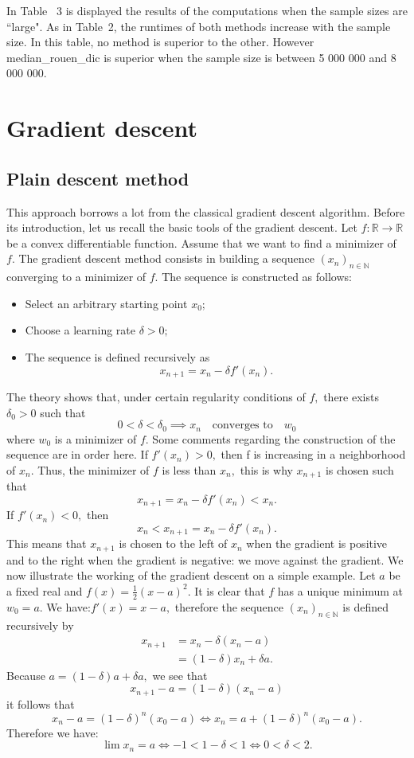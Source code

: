 \documentclass[
  11pt,
  a4paper,
]{article}
\newcommand\N{{\mathbb N}}
\newcommand\R{{\mathbb R}}
\begin{document}
In Table ~3 is displayed the results of the computations when the sample sizes are ``large". As in Table~2, the runtimes of
both methods increase with the sample size. In this table, no method   is superior to the other. However
median\_rouen\_dic  is superior when the
sample size is between 5 000 000 and 8 000 000.



\section{Gradient descent}\label{sec:4}








\subsection{Plain descent method }\label{sec:4.1}

This approach borrows a lot from the classical gradient descent algorithm. Before its introduction, let us
recall the basic tools of the gradient descent. Let $f:\R\longrightarrow \R$ be a convex
differentiable function. Assume that we want to find a minimizer  of $f.$ The gradient descent
method consists in building a sequence $(x_n)_{n\in\N}$ converging to a  minimizer of $f.$
The sequence is constructed as follows:
\begin{itemize}
	\item Select an arbitrary starting point $x_0;$
	\item Choose a learning rate $\delta >0;$
	\item The sequence is defined recursively as
	\[x_{n+1}=x_n -\delta f'(x_n).\]
\end{itemize}
The theory shows that, under certain regularity conditions of $f,$ there exists $\delta_0>0$ 
such that
\[
0<\delta<\delta_0 \implies x_n\quad\text{converges to}\quad w_0
\]
where $w_0$ is a minimizer of $f.$ Some comments regarding the construction of the sequence
are in order here. If $f'(x_n)>0,$ then f is increasing in a neighborhood of $x_n.$ Thus, the minimizer
of $f$ is less than $x_n,$ this is why $x_{n+1}$ is chosen such that
\[
x_{n+1}=x_n -\delta f'(x_n)<x_n.
\]
If $f'(x_n)<0,$ then
\[
x_n<  x_{n+1}=x_n -\delta f'(x_n).
\]
This means that $ x_{n+1}$ is chosen to the left of $x_n$ when the gradient is positive and to
the right when the gradient is negative: we move against the gradient. We now illustrate the working
of the gradient descent on a simple example. Let $a$ be a fixed real and $f(x)={\frac{1}{2}(x-a)^2}.$
It is clear that $f$ has a unique minimum at $w_0=a.$ We have:\quad $f'(x)=x-a,$ therefore
the sequence $(x_n)_{n\in \N}$ is defined recursively by
\begin{align*} 
	x_{n+1} & =x_n-\delta (x_n-a) \\
	& =(1-\delta) x_n+ \delta a.      
\end{align*}
Because $a=(1-\delta) a+\delta a,$ we see that
\[
x_{n+1}-a   =(1-\delta) (x_n-a)\]
it follows that
\[
x_n-a=(1-\delta)^n (x_0-a)\iff x_n=a+ (1-\delta)^n (x_0-a).
\]        
Therefore we have:
\[
\lim x_n=a \iff -1<1-\delta <1\iff 0<\delta<2.
\]
\end{document}

